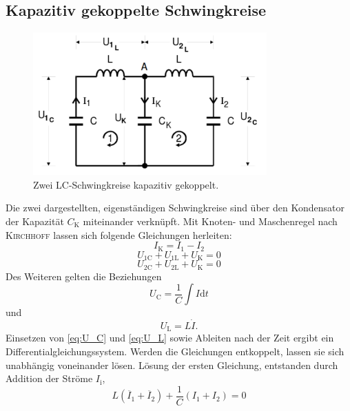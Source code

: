 \subsection{Kapazitiv gekoppelte Schwingkreise}
\label{sec:Theorie1}
\begin{figure}[h]
	\centering
	\label{fig:gekoppelte SK}
		\includegraphics[width=0.8\textwidth]{Bilder/2SK.pdf}
		\caption{Zwei LC-Schwingkreise kapazitiv gekoppelt. \cite{v355}}
\label{fig:gekoppelte SK}
\end{figure}
Die zwei dargestellten, eigenständigen Schwingkreise sind über den Kondensator der Kapazität $C_\mathup{K}$ miteinander verknüpft.
Mit Knoten- und Maschenregel nach \textsc{Kirchhoff} lassen sich folgende Gleichungen herleiten:
\begin{equation}
	I_\mathup{K}=I_1-I_2
	\label{eq:I_k}
\end{equation}
\begin{equation}
	U_{1\mathup{C}}+U_{1\mathup{L}}+U_{\mathup{K}}=0
	\label{eq:U_1}
\end{equation}
\begin{equation}
	U_{2\mathup{C}}+U_{2\mathup{L}}+U_{\mathup{K}}=0
	\label{eq:U_2}
\end{equation}
Des Weiteren gelten die Beziehungen
\begin{equation}
	U_\mathup{C}=\frac{1}{C}\int{I\mathup{d}t}
	\label{eq:U_C}
\end{equation}
und
\begin{equation}
	U_\mathup{L}=L\dot{I}.
	\label{eq:U_L}
\end{equation}
Einsetzen von \eqref{eq:U_C} und \eqref{eq:U_L} sowie Ableiten nach der Zeit ergibt ein Differentialgleichungssystem. 
Werden die Gleichungen entkoppelt, lassen sie sich unabhängig voneinander lösen.
Lösung der ersten Gleichung, entstanden durch Addition der Ströme $I_\text{i}$,
\begin{equation}
	L(\ddot{I_1}+\ddot{I_2})+\frac{1}{C}({I_1}+{I_2})=0
	\label{eq:I_1+I_2}
\end{equation}
